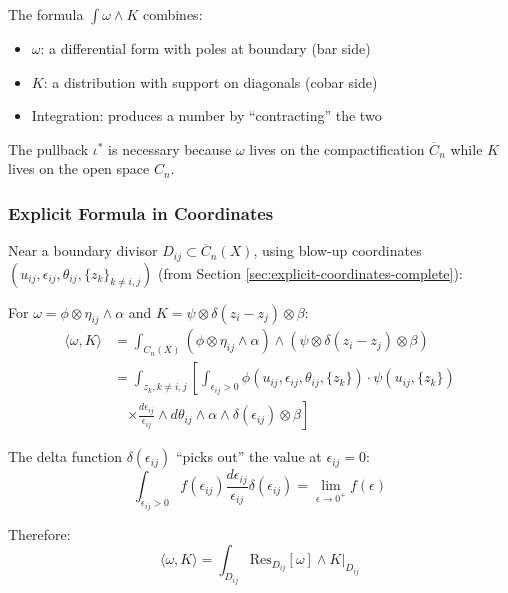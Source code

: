 \begin{remark}
The formula $\int \omega \wedge K$ combines:
\begin{itemize}
\item $\omega$: a differential form with poles at boundary (bar side)
\item $K$: a distribution with support on diagonals (cobar side)
\item Integration: produces a number by ``contracting'' the two
\end{itemize}

The pullback $\iota^*$ is necessary because $\omega$ lives on the compactification
$\overline{C}_n$ while $K$ lives on the open space $C_n$.
\end{remark}

\subsubsection{Explicit Formula in Coordinates}

\begin{proposition}\label{prop:pairing-coordinates}
Near a boundary divisor $D_{ij} \subset \overline{C}_n(X)$, using blow-up coordinates
$(u_{ij}, \epsilon_{ij}, \theta_{ij}, \{z_k\}_{k \neq i,j})$ (from Section \ref{sec:explicit-coordinates-complete}):

For $\omega = \phi \otimes \eta_{ij} \wedge \alpha$ and $K = \psi \otimes \delta(z_i - z_j) \otimes \beta$:
\begin{align}
\langle \omega, K \rangle &= \int_{C_n(X)} (\phi \otimes \eta_{ij} \wedge \alpha) \wedge 
(\psi \otimes \delta(z_i - z_j) \otimes \beta) \nonumber\\
&= \int_{z_k, k \neq i,j} \left[ \int_{\epsilon_{ij} > 0} \phi(u_{ij}, \epsilon_{ij}, \theta_{ij}, \{z_k\}) 
\cdot \psi(u_{ij}, \{z_k\}) \right. \nonumber\\
&\quad \left. \times \frac{d\epsilon_{ij}}{\epsilon_{ij}} \wedge d\theta_{ij} \wedge \alpha 
\wedge \delta(\epsilon_{ij}) \otimes \beta \right] \label{eq:pairing-local}
\end{align}

The delta function $\delta(\epsilon_{ij})$ ``picks out'' the value at $\epsilon_{ij} = 0$:
$$\int_{\epsilon_{ij} > 0} f(\epsilon_{ij}) \frac{d\epsilon_{ij}}{\epsilon_{ij}} 
\delta(\epsilon_{ij}) = \lim_{\epsilon \to 0^+} f(\epsilon)$$

Therefore:
$$\boxed{\langle \omega, K \rangle = \int_{D_{ij}} \text{Res}_{D_{ij}}[\omega] \wedge K|_{D_{ij}}}$$
\end{proposition}

